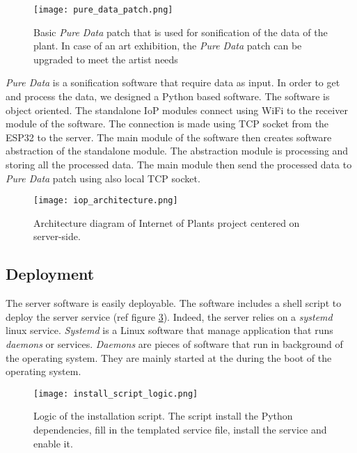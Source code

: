 \begin{figure}[h]
    \centering
    \texttt{[image: pure\_data\_patch.png]}
    \caption{Basic \textit{Pure Data} patch that is used for sonification of the data
        of the plant. In case of an art exhibition, the \textit{Pure Data} patch can be upgraded to meet the
        artist needs}
    \vspace{0.1cm}
    \label{fig:pure_data_patch}
\end{figure}


\textit{Pure Data} is a sonification software that require data as input. In order to get and process the data, we designed a Python based software. %
The software is object oriented. The standalone IoP modules connect using WiFi to the receiver module
of the software. The connection is made using TCP socket from the ESP32 to the server.
The main module of the software then creates software abstraction of the standalone module.
The abstraction module is processing and storing all the processed data.
The main module then send the processed data to \textit{Pure Data} patch using also local TCP socket.

\begin{figure}[h]
    \centering
    \texttt{[image: iop\_architecture.png]}
    \caption{Architecture diagram of Internet of Plants project centered on server-side.}
    \vspace{0.1cm}
    \label{fig:server_architecture}
\end{figure}


\subsection{Deployment} %

The server software is easily deployable. The software includes a shell script to deploy the server service (ref figure \ref{fig:install_script_logic}).
Indeed, the server relies on a \textit{systemd} linux service. \textit{Systemd} \cite{Both2020} is a Linux software that manage application that runs \textit{daemons} or services.
\textit{Daemons} are pieces of software that run in background of the operating
system. They are mainly started at the during the boot of the operating system.

\begin{figure}[h!]
    \centering
    \texttt{[image: install\_script\_logic.png]}
    \caption{Logic of the installation script. The script install the Python dependencies, fill in the templated service file, install the service and enable it.}
    \vspace{0.1cm}
    \label{fig:install_script_logic}
\end{figure}

